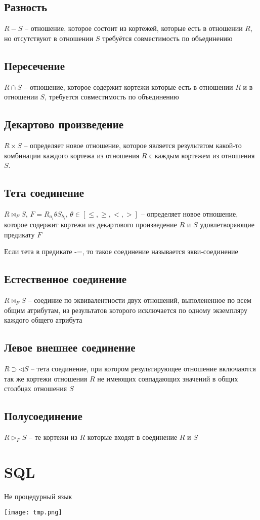 \documentclass[12pt, a4paper]{article}
\begin{document}
\subsection{Разность}

 $R - S$ -- отношение, которое состоит из кортежей, которые есть в отношении $R$, но отсутствуют в отношении $S$ требуётся совместимость по объединению
 
\subsection{Пересечение}

$R \cap S$ -- отношение, которое содержит кортежи которые есть в отношении $R$ и в отношении $S$, требуется совместимость по объединению

\subsection{Декартово произведение}

$R \times S$ -- определяет новое отношение, которое является результатом какой-то комбинации каждого кортежа из отношения $R$ с каждым кортежем из отношения $S$.

\subsection{Тета соединение}

$R \bowtie_F S$, $F = R_{a_i} \theta S_{b_i}$, $\theta \in [\leqslant, \geqslant, <, >]$ -- определяет новое отношение, которое содержит кортежи из декартового произведение $R$ и $S$ удовлетворяющие предикату $F$

Если тета в предикате -=, то такое соединение называется экви-соединение

\subsection{Естественное соединение}

$R \bowtie_F S$ -- соединие по эквивалентности двух отношений, выполененное по всем общим атрибутам, из результатов которого исключается по одному экземпляру каждого общего атрибута

\subsection{Левое внешнее соединение}

$R \supset \triangleleft S$ -- тета соединение, при котором результирующее отношение включаются так же кортежи отношения $R$ не имеющих совпадающих значений в общих столбцах отношения $S$

\subsection{Полусоединение}

$R \triangleright_F S$ -- те кортежи из $R$ которые входят в соединение $R$ и $S$

\newpage
\section{SQL}

Не процедурный язык

\texttt{[image: tmp.png]}
\end{document}
